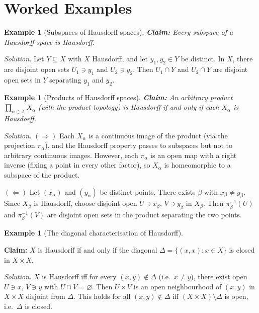 \documentclass[11pt,a4paper,twoside]{book}
\theoremstyle{remark}
\theoremstyle{definition}
\newtheorem{exampleplain}[theorem]{Example}
\theoremstyle{definition}
\newenvironment{example}[1][]{%
  \begin{exampleplain}[#1]\itshape
}{%
  \end{exampleplain}
}
\begin{document}
\section{Worked Examples}
\label{sec:separation-worked}

\begin{example}[Subspaces of Hausdorff spaces]\label{ex:subspace-hausdorff}
\textbf{Claim:} Every subspace of a Hausdorff space is Hausdorff.

\textit{Solution.}  Let $Y \subseteq X$ with $X$ Hausdorff, and let
$y_1, y_2 \in Y$ be distinct.  In $X$, there are disjoint open sets
$U_1 \ni y_1$ and $U_2 \ni y_2$.  Then $U_1 \cap Y$ and $U_2 \cap Y$ are
disjoint open sets in $Y$ separating $y_1$ and $y_2$.
\end{example}

\begin{example}[Products of Hausdorff spaces]\label{ex:product-hausdorff}
\textbf{Claim:} An arbitrary product $\prod_{\alpha \in A} X_\alpha$ (with the
product topology) is Hausdorff if and only if each $X_\alpha$ is Hausdorff.

\textit{Solution.}
$(\Rightarrow)$ Each $X_\alpha$ is a continuous image of the product (via the
projection $\pi_\alpha$), and the Hausdorff property passes to subspaces but
not to arbitrary continuous images.  However, each $\pi_\alpha$ is an open map
with a right inverse (fixing a point in every other factor), so $X_\alpha$ is
homeomorphic to a subspace of the product.

$(\Leftarrow)$ Let $(x_\alpha)$ and $(y_\alpha)$ be distinct points.  There
exists $\beta$ with $x_\beta \neq y_\beta$.  Since $X_\beta$ is Hausdorff,
choose disjoint open $U \ni x_\beta$, $V \ni y_\beta$ in $X_\beta$.  Then
$\pi_\beta^{-1}(U)$ and $\pi_\beta^{-1}(V)$ are disjoint open sets in the
product separating the two points.
\end{example}

\begin{example}[The diagonal characterisation of Hausdorff]
\label{ex:diagonal-hausdorff}
\textbf{Claim:} $X$ is Hausdorff if and only if the diagonal
$\Delta = \{(x,x) : x \in X\}$ is closed in $X \times X$.

\textit{Solution.}  $X$ is Hausdorff iff for every $(x,y) \notin \Delta$
(i.e.\ $x \neq y$), there exist open $U \ni x$, $V \ni y$ with
$U \cap V = \varnothing$.  Then $U \times V$ is an open neighbourhood of
$(x,y)$ in $X \times X$ disjoint from $\Delta$.  This holds for all
$(x,y) \notin \Delta$ iff $(X \times X) \setminus \Delta$ is open, i.e.\
$\Delta$ is closed.
\end{example}
\end{document}
